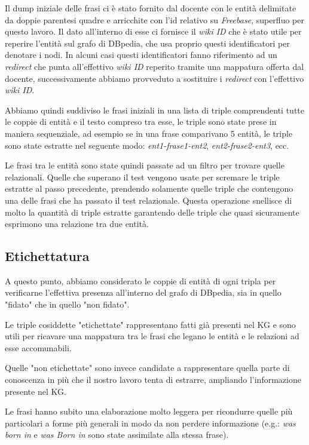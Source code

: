 \documentclass[10pt,a4paper,twocolumn]{article}
\begin{document}
Il dump iniziale delle frasi ci è stato fornito dal docente con le entità delimitate da doppie parentesi quadre e arricchite con l'id relativo su \textit{Freebase}, superfluo per questo lavoro. Il dato all'interno di esse ci fornisce il \textit{wiki ID} che è stato utile per reperire l'entità sul grafo di DBpedia, che usa proprio questi identificatori per denotare i nodi. In alcuni casi questi identificatori fanno riferimento ad un \textit{redirect} che punta all'effettivo \textit{wiki ID} reperito tramite una mappatura offerta dal docente, successivamente abbiamo provveduto a sostituire i \textit{redirect} con l'effettivo \textit{wiki ID}.

Abbiamo quindi suddiviso le frasi iniziali in una lista di triple comprendenti tutte le coppie di entità e il testo compreso tra esse, le triple sono state prese in maniera sequenziale, ad esempio se in una frase comparivano 5 entità, le triple sono state estratte nel seguente modo: \textit{ent1-frase1-ent2}, \textit{ent2-frase2-ent3}, ecc.

Le frasi tra le entità sono state quindi passate ad un filtro per trovare quelle relazionali. Quelle che superano il test vengono usate per scremare le triple estratte al passo precedente, prendendo solamente quelle triple che contengono una delle frasi che ha passato il test relazionale. Questa operazione snellisce di molto la quantità di triple estratte garantendo delle triple che quasi sicuramente esprimono una relazione tra due entità.

\subsection{Etichettatura}
A questo punto, abbiamo considerato le coppie di entità di ogni tripla per verificarne l'effettiva presenza all'interno del grafo di DBpedia, sia in quello "fidato" che in quello "non fidato".

Le triple cosiddette "etichettate" rappresentano fatti già presenti nel KG e sono utili per ricavare una mappatura tra le frasi che legano le entità e le relazioni ad esse accomunabili.

Quelle "non etichettate" sono invece candidate a rappresentare quella parte di conoscenza in più che il nostro lavoro tenta di estrarre, ampliando l'informazione presente nel KG.

Le frasi hanno subito una elaborazione molto leggera per ricondurre quelle più particolari a forme più generali in modo da non perdere informazione (e.g.: \textit{was born in} e \textit{was Born in} sono state assimilate alla stessa frase).
\end{document}
